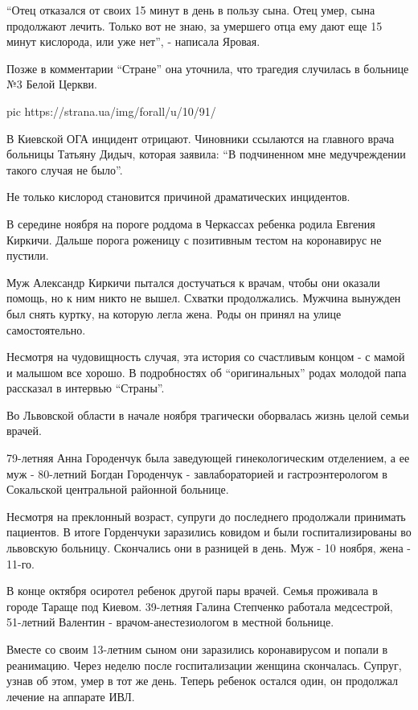 \enquote{Отец отказался от своих 15 минут в день в пользу сына. Отец умер, сына
продолжают лечить. Только вот не знаю, за умершего отца ему дают еще 15 минут
кислорода, или уже нет}, - написала Яровая.

Позже в комментарии \enquote{Стране} она уточнила, что трагедия случилась в больнице №3
Белой Церкви. 

\ifcmt
pic https://strana.ua/img/forall/u/10/91/%
\fi

В Киевской ОГА инцидент отрицают. Чиновники ссылаются на главного врача
больницы Татьяну Дидыч, которая заявила: \enquote{В подчиненном мне медучреждении
такого случая не было}. 

Не только кислород становится причиной драматических инцидентов. 

В середине ноября на пороге роддома в Черкассах ребенка родила Евгения Киркичи.
Дальше порога роженицу с позитивным тестом на коронавирус не пустили. 

Муж Александр Киркичи пытался достучаться к врачам, чтобы они оказали помощь,
но к ним никто не вышел. Схватки продолжались. Мужчина вынужден был снять
куртку, на которую легла жена. Роды он принял на улице самостоятельно. 

Несмотря на чудовищность случая, эта история со счастливым концом - с мамой и
малышом все хорошо. В подробностях об \enquote{оригинальных} родах молодой папа
рассказал в интервью \enquote{Страны}.

Во Львовской области в начале ноября трагически оборвалась жизнь целой семьи
врачей. 

79-летняя Анна Городенчук была заведующей гинекологическим отделением, а ее муж
- 80-летний Богдан Городенчук - завлабораторией и гастроэнтерологом в
Сокальской центральной районной больнице.

Несмотря на преклонный возраст, супруги до последнего продолжали принимать
пациентов. В итоге Горденчуки заразились ковидом и были госпитализированы во
львовскую больницу. Скончались они в разницей в день. Муж - 10 ноября, жена -
11-го. 

В конце октября осиротел ребенок другой пары врачей. Семья проживала в городе
Тараще под Киевом. 39-летняя Галина Степченко работала медсестрой, 51-летний
Валентин - врачом-анестезиологом в местной больнице.

Вместе со своим 13-летним сыном они заразились коронавирусом и попали в
реанимацию. Через неделю после госпитализации женщина скончалась. Супруг, узнав
об этом, умер в тот же день. Теперь ребенок остался один, он продолжал лечение
на аппарате ИВЛ.
